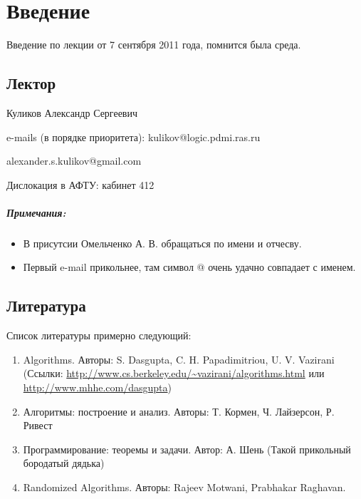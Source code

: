 \chapter{Введение}

Введение по лекции от 7 сентября 2011 года, помнится была среда.

\section{Лектор}

{\large Куликов Александр Сергеевич}
\par\bigskip

e-mails (в порядке приоритета): \hfill kulikov@logic.pdmi.ras.ru 

\hfill alexander.s.kulikov@gmail.com
\par\bigskip

Дислокация в АФТУ: \hfill кабинет 412
\par\bigskip

\paragraph{Примечания:}

\begin{itemize}

\item В присутсии Омельченко А. В. обращаться по имени и отчесву.

\item Первый e-mail прикольнее, там символ @ очень удачно совпадает с именем.

\end{itemize}

\section{Литература}

Список литературы примерно следующий:

\begin{enumerate}
\item Algorithms. Авторы: S. Dasgupta, C. H. Papadimitriou, U. V. Vazirani (Ссылки: \url{http://www.cs.berkeley.edu/~vazirani/algorithms.html} или \url{http://www.mhhe.com/dasgupta})

\item Алгоритмы: построение и анализ. Авторы: Т. Кормен, Ч. Лайзерсон, Р. Ривест

\item Программирование: теоремы и задачи. Автор: А. Шень (Такой прикольный бородатый дядька)

\item Randomized Algorithms. Авторы: Rajeev Motwani, Prabhakar Raghavan.
\end{enumerate}

